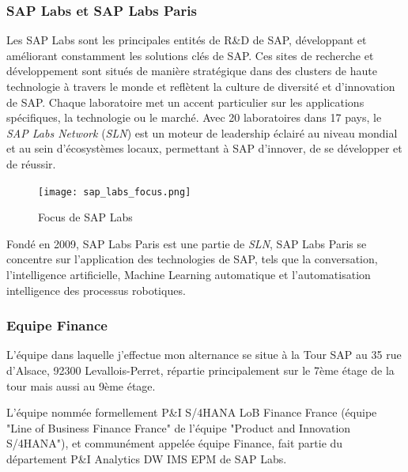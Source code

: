     \subsubsection{SAP Labs et SAP Labs Paris}
    
     Les SAP Labs sont les principales entités de R\&D de SAP, développant et améliorant constamment les solutions clés de SAP. Ces sites de recherche et développement sont situés de manière stratégique dans des clusters de haute technologie à travers le monde et reflètent la culture de diversité et d’innovation de SAP. Chaque laboratoire met un accent particulier sur les applications spécifiques, la technologie ou le marché. Avec 20 laboratoires dans 17 pays, le \textit{SAP Labs Network} (\textit{SLN}) est un moteur de leadership éclairé au niveau mondial et au sein d'écosystèmes locaux, permettant à SAP d'innover, de se développer et de réussir.
        \begin{figure}[H]
            \centering
            \texttt{[image: sap\_labs\_focus.png]}
            \caption{Focus de SAP Labs}
            \label{fig:SAP_Labs_Focus_label}
        \end{figure}
        
    \par Fondé en 2009, SAP Labs Paris est une partie de \textit{SLN}, SAP Labs Paris se concentre sur l'application des technologies de SAP, tels que la conversation, l'intelligence artificielle, Machine Learning automatique et l'automatisation intelligence des processus robotiques.
    
    \subsubsection{Equipe Finance}
        L'équipe dans laquelle j'effectue mon alternance se situe à la Tour SAP au 35 rue d'Alsace, 92300 Levallois-Perret, répartie principalement sur le 7ème étage de la tour mais aussi au 9ème étage.
        
        \par L'équipe nommée formellement P\&I S/4HANA LoB Finance France (équipe "Line of Business Finance France" de l’équipe "Product and Innovation S/4HANA"), et communément appelée équipe Finance, fait partie du département P\&I Analytics DW IMS EPM de SAP Labs.
